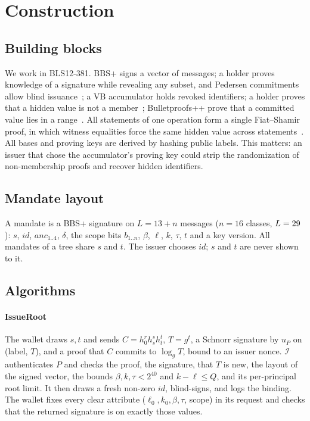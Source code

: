\section{Construction}\label{sec:construction}
\subsection{Building blocks}
We work in BLS12-381.
BBS+ signs a vector of messages; a holder proves knowledge of a signature while revealing any subset, and Pedersen commitments allow blind issuance~\cite{au2006bbsplus,camenisch2016bbsplus,pedersen1991}; a VB accumulator holds revoked identifiers; a holder proves that a hidden value is not a member~\cite{vitto2022vb}; Bulletproofs++ prove that a committed value lies in a range~\cite{eagen2024bpp}.
All statements of one operation form a single Fiat--Shamir proof, in which witness equalities force the same hidden value across statements~\cite{dockcrypto}. All bases and proving keys are derived by hashing public labels. This matters: an issuer that chose the accumulator's proving key could strip the randomization of non-membership proofs and recover hidden identifiers.

\subsection{Mandate layout}
A mandate is a BBS+ signature on $L=13+n$ messages ($n=16$ classes, $L=29$): $s$, $\mathit{id}$, $\mathit{anc}_{1..4}$, $\delta$, the scope bits $b_{1..n}$, $\beta$, $\ell$, $k$, $\tau$, $t$ and a key version. All mandates of a tree share $s$ and $t$. The issuer chooses $\mathit{id}$; $s$ and $t$ are never shown to it.

\subsection{Algorithms}
\paragraph*{IssueRoot} The wallet draws $s,t$ and sends $C=h_0^{r}h_s^{s}h_t^{t}$, $T=g^{t}$, a Schnorr signature by $u_P$ on (label, $T$), and a proof that $C$ commits to $\log_g T$, bound to an issuer nonce. $\mathcal{I}$ authenticates $P$ and checks the proof, the signature, that $T$ is new, the layout of the signed vector, the bounds $\beta,k,\tau<2^{40}$ and $k-\ell\le Q$, and its per-principal root limit. It then draws a fresh non-zero $\mathit{id}$, blind-signs, and logs the binding. The wallet fixes every clear attribute ($\ell_0,k_0,\beta,\tau$, scope) in its request and checks that the returned signature is on exactly those values.

